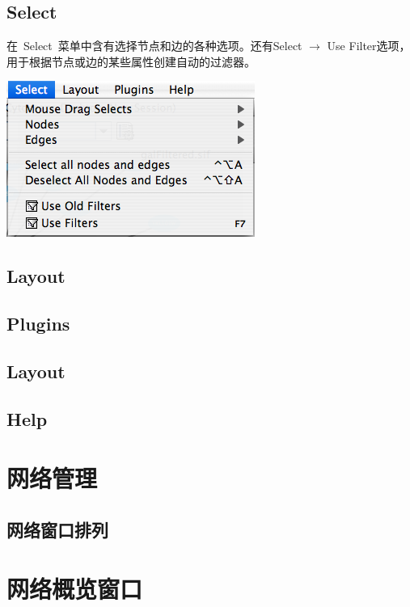	\subsection{Select}
	在~Select~菜单中含有选择节点和边的各种选项。还有Select $\rightarrow$ Use Filter选项，用于根据节点或边的某些属性创建自动的过滤器。

	\centerline{\includegraphics{images/menu_select_26.png}}

	\subsection{Layout}
		
	
	\subsection{Plugins}
	
	\subsection{Layout}
	
	\subsection{Help}

\section{网络管理}
	\subsection{网络窗口排列}

\section{网络概览窗口}
	




